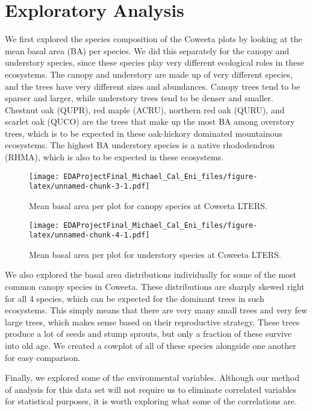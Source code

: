 \documentclass[
  12pt,
]{article}
\begin{document}
\newpage

\hypertarget{exploratory-analysis}{%
\section{Exploratory Analysis}\label{exploratory-analysis}}

We first explored the species composition of the Coweeta plots by
looking at the mean basal area (BA) per species. We did this separately
for the canopy and understory species, since these species play very
different ecological roles in these ecosystems. The canopy and
understory are made up of very different species, and the trees have
very different sizes and abundances. Canopy trees tend to be sparser and
larger, while understory trees tend to be denser and smaller. Chestnut
oak (QUPR), red maple (ACRU), northern red oak (QURU), and scarlet oak
(QUCO) are the trees that make up the most BA among overstory trees,
which is to be expected in these oak-hickory dominated mountainous
ecosystems. The highest BA understory species is a native rhododendron
(RHMA), which is also to be expected in these ecosystems.

\begin{figure}
\centering
\texttt{[image: EDAProjectFinal\_Michael\_Cal\_Eni\_files/figure-latex/unnamed-chunk-3-1.pdf]}
\caption{Mean basal area per plot for canopy species at Coweeta LTERS.}
\end{figure}

\newpage

\begin{figure}
\centering
\texttt{[image: EDAProjectFinal\_Michael\_Cal\_Eni\_files/figure-latex/unnamed-chunk-4-1.pdf]}
\caption{Mean basal area per plot for understory species at Coweeta
LTERS.}
\end{figure}

We also explored the basal area distributions individually for some of
the most common canopy species in Coweeta. These distributions are
sharply skewed right for all 4 species, which can be expected for the
dominant trees in such ecosystems. This simply means that there are very
many small trees and very few large trees, which makes sense based on
their reproductive strategy. These trees produce a lot of seeds and
stump sprouts, but only a fraction of these survive into old age. We
created a cowplot of all of these species alongside one another for easy
comparison.

Finally, we explored some of the environmental variables. Although our
method of analysis for this data set will not require us to eliminate
correlated variables for statistical purposes, it is worth exploring
what some of the correlations are.
\end{document}
